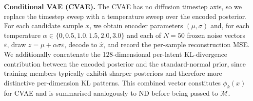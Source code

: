 \documentclass[11pt]{article}
\newcommand{\emma}[1]{\textcolor{orange}{Emma: #1}}
\newcommand{\steven}[1]{\textcolor{Periwinkle}{Steven: #1}}
\begin{document}
\vspace{0.3em}
\noindent
\textbf{Conditional VAE (CVAE).} The CVAE has no diffusion timestep axis, so we replace the timestep sweep with a temperature sweep over the encoded posterior. For each candidate sample $x$, we obtain encoder parameters $(\mu, \sigma)$ and, for each temperature $\alpha \in \{0, 0.5, 1.0, 1.5, 2.0, 3.0\}$ and each of $N = 50$ frozen noise vectors $\varepsilon$, draw $z = \mu + \alpha\sigma\varepsilon$, decode to $\hat{x}$, and record the per-sample reconstruction MSE. We additionally concatenate the 128-dimensional per-latent KL-divergence contribution between the encoded posterior and the standard-normal prior, since training members typically exhibit sharper posteriors and therefore more distinctive per-dimension KL patterns. This combined vector constitutes $\phi_k(x)$ for CVAE and is summarised analogously to ND before being passed to $\mathcal{M}$. 



\end{document}
